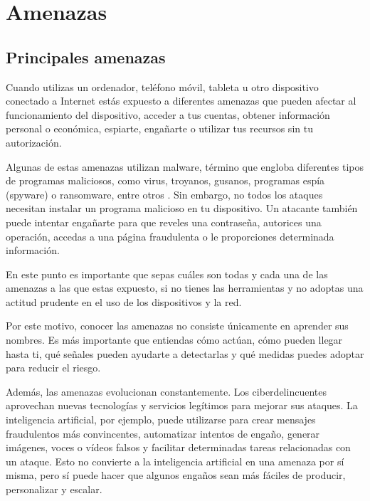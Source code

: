 \documentclass[
  spanish,
  a4paper,
  openany]{book}
\begin{document}
\chapter{Amenazas}\label{amenazas}

\section{Principales amenazas}\label{principales-amenazas}

Cuando utilizas un ordenador, teléfono móvil, tableta u otro dispositivo conectado a Internet estás expuesto a diferentes amenazas que pueden afectar al funcionamiento del dispositivo, acceder a tus cuentas, obtener información personal o económica, espiarte, engañarte o utilizar tus recursos sin tu autorización.

Algunas de estas amenazas utilizan malware, término que engloba diferentes tipos de programas maliciosos, como virus, troyanos, gusanos, programas espía (spyware) o ransomware, entre otros \citep{WIKI-malware}. Sin embargo, no todos los ataques necesitan instalar un programa malicioso en tu dispositivo. Un atacante también puede intentar engañarte para que reveles una contraseña, autorices una operación, accedas a una página fraudulenta o le proporciones determinada información.

En este punto es importante que sepas cuáles son todas y cada una de las amenazas a las que estas expuesto, si no tienes las herramientas y no adoptas una actitud prudente en el uso de los dispositivos y la red.

Por este motivo, conocer las amenazas no consiste únicamente en aprender sus nombres. Es más importante que entiendas cómo actúan, cómo pueden llegar hasta ti, qué señales pueden ayudarte a detectarlas y qué medidas puedes adoptar para reducir el riesgo.

Además, las amenazas evolucionan constantemente. Los ciberdelincuentes aprovechan nuevas tecnologías y servicios legítimos para mejorar sus ataques. La inteligencia artificial, por ejemplo, puede utilizarse para crear mensajes fraudulentos más convincentes, automatizar intentos de engaño, generar imágenes, voces o vídeos falsos y facilitar determinadas tareas relacionadas con un ataque. Esto no convierte a la inteligencia artificial en una amenaza por sí misma, pero sí puede hacer que algunos engaños sean más fáciles de producir, personalizar y escalar.
\end{document}
